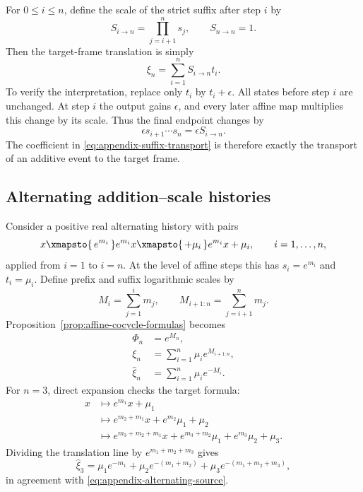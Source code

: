 For $0\le i\le n$, define the scale of the strict suffix after step $i$ by
\[
  S_{i\to n}=\prod_{j=i+1}^{n}s_j,
  \qquad S_{n\to n}=1.
\]
Then the target-frame translation is simply
\begin{equation}
  \xi_n=\sum_{i=1}^{n}S_{i\to n}t_i.
  \label{eq:appendix-suffix-transport}
\end{equation}
To verify the interpretation, replace only $t_i$ by $t_i+\epsilon$.  All
states before step $i$ are unchanged.  At step $i$ the output gains
$\epsilon$, and every later affine map multiplies this change by its scale.
Thus the final endpoint changes by
\[
  \epsilon s_{i+1}\cdots s_n
  =\epsilon S_{i\to n}.
\]
The coefficient in \eqref{eq:appendix-suffix-transport} is therefore exactly
the transport of an additive event to the target frame.

\subsection{Alternating addition--scale histories}

Consider a positive real alternating history with pairs
\[
  x\xmapsto{\,e^{m_i}\,}e^{m_i}x
  \xmapsto{\,+\mu_i\,}e^{m_i}x+\mu_i,
  \qquad i=1,\ldots,n,
\]
applied from $i=1$ to $i=n$.  At the level of affine steps this has
$s_i=e^{m_i}$ and $t_i=\mu_i$.  Define prefix and suffix logarithmic
scales by
\[
  M_i=\sum_{j=1}^{i}m_j,
  \qquad
  M_{i+1:n}=\sum_{j=i+1}^{n}m_j.
\]
Proposition~\ref{prop:affine-cocycle-formulas} becomes
\begin{align}
  \Phi_n&=e^{M_n},
  \label{eq:appendix-alternating-scale}\\
  \xi_n&=\sum_{i=1}^{n}\mu_i e^{M_{i+1:n}},
  \label{eq:appendix-alternating-target}\\
  \widehat\xi_n&=\sum_{i=1}^{n}\mu_i e^{-M_i}.
  \label{eq:appendix-alternating-source}
\end{align}
For $n=3$, direct expansion checks the target formula:
\begin{align*}
  x
  &\longmapsto e^{m_1}x+\mu_1\\
  &\longmapsto e^{m_2+m_1}x
      +e^{m_2}\mu_1+\mu_2\\
  &\longmapsto e^{m_3+m_2+m_1}x
      +e^{m_3+m_2}\mu_1
      +e^{m_3}\mu_2+\mu_3.
\end{align*}
Dividing the translation line by
$e^{m_1+m_2+m_3}$ gives
\[
  \widehat\xi_3
  =\mu_1e^{-m_1}
   +\mu_2e^{-(m_1+m_2)}
   +\mu_3e^{-(m_1+m_2+m_3)},
\]
in agreement with \eqref{eq:appendix-alternating-source}.

